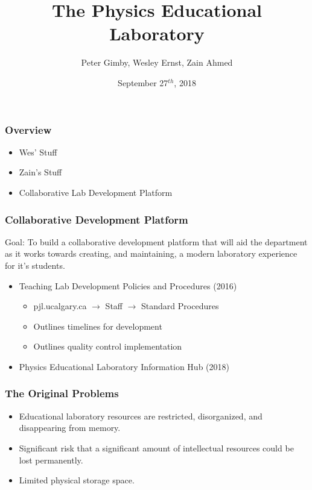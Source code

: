 \documentclass{beamer} %
\title[Lab Information Hub]{The Physics Educational Laboratory}
\author{Peter Gimby, Wesley Ernst, Zain Ahmed}
\institute[UCalgary]{University of Calgary}
\date{September 27$^{th}$, 2018}
\begin{document}
\frame[plain]{\titlepage}

\begin{frame}
\frametitle{Overview}
	\begin{itemize}
		\item{Wes' Stuff}
		\item{Zain's Stuff}
		\item{Collaborative Lab Development Platform}
	\end{itemize}
\end{frame}


\begin{frame}
\frametitle{Collaborative Development Platform}\color{black}
Goal: To build a collaborative development platform that will aid the department as it works towards creating, and maintaining, a modern laboratory experience for it's students.

\begin{itemize}
\item<2- > Teaching Lab Development Policies and Procedures (2016)	\href{https://pjl.ucalgary.ca/staffresources/procedures/Teaching-Labs-Development-Policies-and-Procedures/Teaching-Labs-Development-Policies-and-Procedures.pdf}{}
	\begin{itemize}
	\item pjl.ucalgary.ca $\rightarrow$ Staff $\rightarrow$ Standard Procedures
	\item Outlines timelines for development
	\item Outlines quality control implementation
	
	\end{itemize}

\item<3 -> Physics Educational Laboratory Information Hub (2018)

\end{itemize}

\end{frame}

	
\begin{frame}
\frametitle{The Original Problems}\color{black}
	\begin{itemize}
	\item Educational laboratory resources are restricted, disorganized, and disappearing from memory.
	\item Significant risk that a significant amount of intellectual resources could be lost permanently.
	\item Limited physical storage space.
	\end{itemize}
\end{frame}
\end{document}
